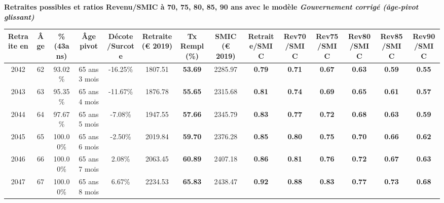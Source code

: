  \vspace{0.1cm} 
{\bf \noindent Retraites possibles et ratios Revenu/SMIC à 70, 75, 80, 85, 90 ans avec le modèle \emph{Gouvernement corrigé (âge-pivot glissant)}}  
 
\begin{adjustbox}{max width=\textwidth} 
\begin{tabular}[htb]{|c|c||c|c|c||c|c||c||c|c|c|c|c|c|} 
\hline 
 Retraite en &  Âge &  \%(43ans) &  Âge pivot &  Décote/Surcote &  Retraite (\euro{} 2019) &  Tx Rempl(\%) &  SMIC (\euro{} 2019) &  Retraite/SMIC &  Rev70/SMIC &  Rev75/SMIC &  Rev80/SMIC &  Rev85/SMIC &  Rev90/SMIC \\ 
\hline \hline 
 2042 &  62 &  93.02\% &  65 ans 3 mois &  -16.25\% &  1807.51 &  {\bf 53.69} &  2285.97 &  {\bf {\color{red} 0.79}} &  {\bf {\color{red} 0.71}} &  {\bf {\color{red} 0.67}} &  {\bf {\color{red} 0.63}} &  {\bf {\color{red} 0.59}} &  {\bf {\color{red} 0.55}} \\ 
\hline 
 2043 &  63 &  95.35\% &  65 ans 4 mois &  -11.67\% &  1876.78 &  {\bf 55.65} &  2315.68 &  {\bf {\color{red} 0.81}} &  {\bf {\color{red} 0.74}} &  {\bf {\color{red} 0.69}} &  {\bf {\color{red} 0.65}} &  {\bf {\color{red} 0.61}} &  {\bf {\color{red} 0.57}} \\ 
\hline 
 2044 &  64 &  97.67\% &  65 ans 5 mois &  -7.08\% &  1947.55 &  {\bf 57.66} &  2345.79 &  {\bf {\color{red} 0.83}} &  {\bf {\color{red} 0.77}} &  {\bf {\color{red} 0.72}} &  {\bf {\color{red} 0.68}} &  {\bf {\color{red} 0.63}} &  {\bf {\color{red} 0.59}} \\ 
\hline 
 2045 &  65 &  100.00\% &  65 ans 6 mois &  -2.50\% &  2019.84 &  {\bf 59.70} &  2376.28 &  {\bf {\color{red} 0.85}} &  {\bf {\color{red} 0.80}} &  {\bf {\color{red} 0.75}} &  {\bf {\color{red} 0.70}} &  {\bf {\color{red} 0.66}} &  {\bf {\color{red} 0.62}} \\ 
\hline 
 2046 &  66 &  100.00\% &  65 ans 7 mois &  2.08\% &  2063.45 &  {\bf 60.89} &  2407.18 &  {\bf {\color{red} 0.86}} &  {\bf {\color{red} 0.81}} &  {\bf {\color{red} 0.76}} &  {\bf {\color{red} 0.72}} &  {\bf {\color{red} 0.67}} &  {\bf {\color{red} 0.63}} \\ 
\hline 
 2047 &  67 &  100.00\% &  65 ans 8 mois &  6.67\% &  2234.53 &  {\bf 65.83} &  2438.47 &  {\bf {\color{red} 0.92}} &  {\bf {\color{red} 0.88}} &  {\bf {\color{red} 0.83}} &  {\bf {\color{red} 0.77}} &  {\bf {\color{red} 0.73}} &  {\bf {\color{red} 0.68}} \\ 
\hline 
\hline 
\end{tabular} 
\end{adjustbox} 
 
